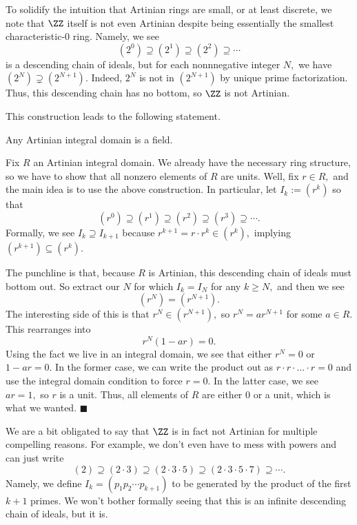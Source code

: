 To solidify the intuition that Artinian rings are small, or at least discrete, we note that $\ZZ$ itself is not even Artinian despite being essentially the smallest characteristic-$0$ ring. Namely, we see
\[\left(2^0\right)\supseteq\left(2^1\right)\supseteq\left(2^2\right)\supseteq\cdots\]
is a descending chain of ideals, but for each nonnnegative integer $N,$ we have $\left(2^N\right)\supsetneq\left(2^{N+1}\right).$ Indeed, $2^N$ is not in $\left(2^{N+1}\right)$ by unique prime factorization. Thus, this descending chain has no bottom, so $\ZZ$ is not Artinian.

This construction leads to the following statement.
\begin{proposition}
    Any Artinian integral domain is a field.
\end{proposition}
Fix $R$ an Artinian integral domain. We already have the necessary ring structure, so we have to show that all nonzero elements of $R$ are units. Well, fix $r\in R,$ and the main idea is to use the above construction. In particular, let $I_k:=\left(r^k\right)$ so that
\[\left(r^0\right)\supseteq\left(r^1\right)\supseteq\left(r^2\right)\supseteq\left(r^3\right)\supseteq\cdots.\]
Formally, we see $I_k\supseteq I_{k+1}$ because $r^{k+1}=r\cdot r^k\in\left(r^k\right),$ implying $\left(r^{k+1}\right)\subseteq\left(r^k\right).$

The punchline is that, because $R$ is Artinian, this descending chain of ideals must bottom out. So extract our $N$ for which $I_k=I_N$ for any $k\ge N,$ and then we see
\[\left(r^N\right)=\left(r^{N+1}\right).\]
The interesting side of this is that $r^N\in\left(r^{N+1}\right),$ so $r^N=ar^{N+1}$ for some $a\in R.$ This rearranges into
\[r^N\left(1-ar\right)=0.\]
Using the fact we live in an integral domain, we see that either $r^N=0$ or $1-ar=0.$ In the former case, we can write the product out as $r\cdot r\cdot\ldots\cdot r=0$ and use the integral domain condition to force $r=0.$ In the latter case, we see $ar=1,$ so $r$ is a unit. Thus, all elements of $R$ are either $0$ or a unit, which is what we wanted. $\blacksquare$

We are a bit obligated to say that $\ZZ$ is in fact not Artinian for multiple compelling reasons. For example, we don't even have to mess with powers and can just write
\[(2)\supseteq(2\cdot3)\supseteq(2\cdot3\cdot5)\supseteq(2\cdot3\cdot5\cdot7)\supseteq\cdots.\]
Namely, we define $I_k=(p_1p_2\cdots p_{k+1})$ to be generated by the product of the first $k+1$ primes. We won't bother formally seeing that this is an infinite descending chain of ideals, but it is.

